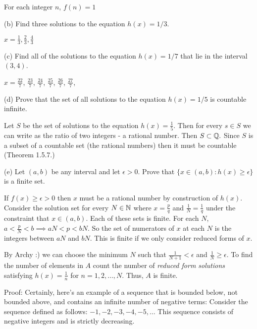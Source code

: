 \documentclass{report}
\begin{document}
\sol For each integer $n$, $f(n)=1$
\bigskip

(b) Find three solutions to the equation $h(x)=1 / 3$.

\sol $ x = \frac{1}{3}, \frac{2}{3}, \frac{4}{3}$

\bigskip
(c) Find all of the solutions to the equation $h(x)=1 / 7$ that lie in the interval $(3,4)$.

\sol $x = \frac{22}{7}$, $\frac{23}{7}$, $\frac{24}{7}$, $\frac{25}{7}$, $\frac{26}{7}$, $\frac{27}{7}$,

\bigskip
(d) Prove that the set of all solutions to the equation $h(x)=1 / 5$ is countable infinite.

\sol
\begin{myproof}
    Let $S$ be the set of solutions to the equation $h(x)= \frac{1}{5}.$ Then for every $s \in S$ we can write as the ratio of two integers - a rational number. Then $S \subset \QQ.$ Since $S$ is a subset of a countable set (the rational numbers) then it must be countable (Theorem 1.5.7.) 
\end{myproof}
\bigskip
(e) Let $(a, b)$ be any interval and let $\epsilon>0$. Prove that $\{x \in(a, b): h(x) \geq \epsilon\}$ is a finite set.
\par
\bigskip
\sol
If $f(x) \geq \epsilon > 0$ then $x$ must be a rational number by construction of $h(x).$  Consider the solution set for every $N\in \NN$ where $x = \frac{p}{q}$ and $\frac{1}{N} = \frac{1}{q}$ under the constraint that $x \in (a,b)$.  Each of these sets is finite. For each $N$, $ a < \frac{p}{N} < b \implies aN < p < bN.$ So the set of numerators of $x$ at each $N$ is the integers between $aN$ and $bN.$ This is finite if we only consider reduced forms of $x.$

By Archy :) we can choose the minimum $N$ such that $\frac{1}{N+1} < \epsilon$ and $\frac{1}{N} \geq \epsilon.$ To find the number of elements in $A$ count the number of \textit{reduced form solutions} satisfying $h(x) = \frac{1}{n}$ for $n = 1,2,\dots, N$. Thus, $A$ is finite.

\pagebreak
{}

Proof: Certainly, here's an example of a sequence that is bounded below, not bounded above, and contains an infinite number of negative terms:
Consider the sequence defined as follows: $-1,-2,-3,-4,-5, \ldots$
This sequence consists of negative integers and is strictly decreasing.
\end{document}
